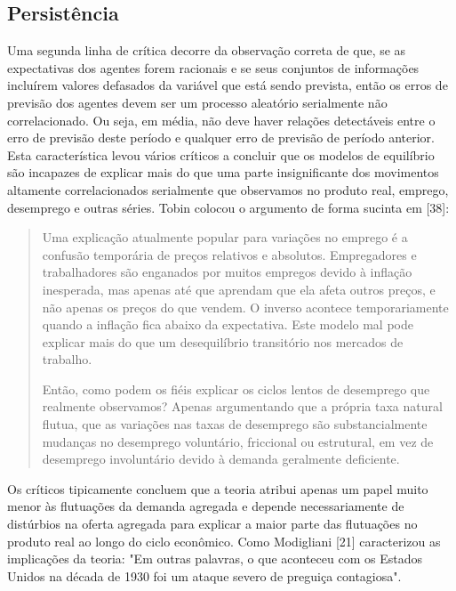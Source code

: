 \documentclass[12pt]{article}
\begin{document}
\subsection{Persistência}

Uma segunda linha de crítica decorre da observação correta de que, se as expectativas dos agentes forem racionais e se seus conjuntos de informações incluírem valores defasados da variável que está sendo prevista, então os erros de previsão dos agentes devem ser um processo aleatório serialmente não correlacionado. Ou seja, em média, não deve haver relações detectáveis entre o erro de previsão deste período e qualquer erro de previsão de período anterior. Esta característica levou vários críticos a concluir que os modelos de equilíbrio são incapazes de explicar mais do que uma parte insignificante dos movimentos altamente correlacionados serialmente que observamos no produto real, emprego, desemprego e outras séries. Tobin colocou o argumento de forma sucinta em [38]:

\begin{quote}
    Uma explicação atualmente popular para variações no emprego é a confusão temporária de preços relativos e absolutos. Empregadores e trabalhadores são enganados por muitos empregos devido à inflação inesperada, mas apenas até que aprendam que ela afeta outros preços, e não apenas os preços do que vendem. O inverso acontece temporariamente quando a inflação fica abaixo da expectativa. Este modelo mal pode explicar mais do que um desequilíbrio transitório nos mercados de trabalho.
    
    Então, como podem os fiéis explicar os ciclos lentos de desemprego que realmente observamos? Apenas argumentando que a própria taxa natural flutua, que as variações nas taxas de desemprego são substancialmente mudanças no desemprego voluntário, friccional ou estrutural, em vez de desemprego involuntário devido à demanda geralmente deficiente.
\end{quote}

Os críticos tipicamente concluem que a teoria atribui apenas um papel muito menor às flutuações da demanda agregada e depende necessariamente de distúrbios na oferta agregada para explicar a maior parte das flutuações no produto real ao longo do ciclo econômico. Como Modigliani [21] caracterizou as implicações da teoria: "Em outras palavras, o que aconteceu com os Estados Unidos na década de 1930 foi um ataque severo de preguiça contagiosa".
\end{document}
